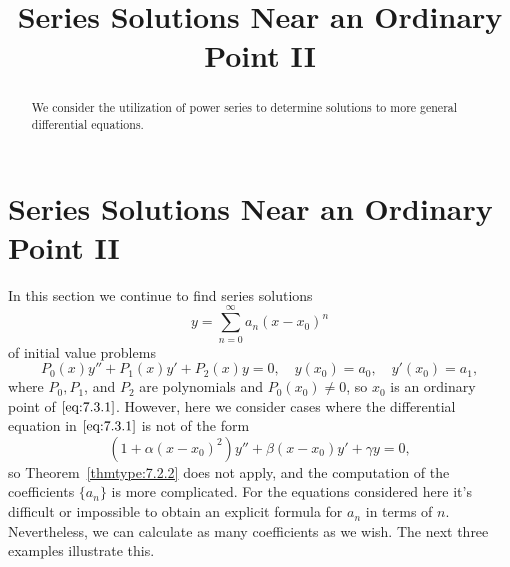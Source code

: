 \documentclass{ximera}
\title{Series Solutions Near an Ordinary Point II}%
\begin{document}
\begin{abstract}
We consider the utilization of power series to determine solutions to more general differential equations.
\end{abstract}

\maketitle

\section*{Series Solutions Near an Ordinary Point II}

In this section we continue to find series solutions
$$
y=\sum_{n=0}^\infty a_n(x-x_0)^n
$$
of initial value problems
\begin{equation} \label{eq:7.3.1}
P_0(x)y''+P_1(x)y'+P_2(x)y=0,\quad y(x_0)=a_0,\quad y'(x_0)=a_1,
\end{equation}
where $P_0,P_1$, and $P_2$ are polynomials and $P_0(x_0)\neq0$,
so $x_0$ is an ordinary point of $\eqref{eq:7.3.1}$.  However, here we
consider cases where the differential equation in $\eqref{eq:7.3.1}$
is not of the form
$$
\left(1+\alpha(x-x_0)^2\right)y''+\beta(x-x_0) y'+\gamma y=0,
$$
so Theorem~\ref{thmtype:7.2.2} does not apply, and the computation of the
coefficients $\{a_n\}$ is more complicated. For the equations
considered here it's difficult or impossible to obtain an explicit
formula for $a_n$ in terms of $n$. Nevertheless, we can calculate as
many coefficients as we wish. The next three examples illustrate
this.
\end{document}
